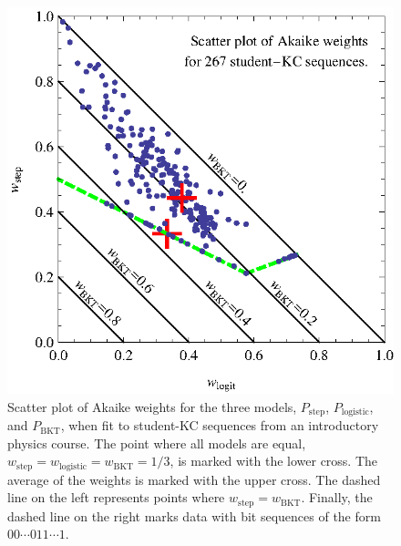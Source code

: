 \documentclass{edm_template}
\begin{document}
\begin{figure}
  \centering \includegraphics{scatter-weights.eps}
  \caption{Scatter plot of  Akaike weights for the three models, 
   $P_\mathrm{step}$, $P_\mathrm{logistic}$, and $P_\mathrm{BKT}$, 
   when fit to student-KC sequences from an introductory physics course.
   The point where all models are equal,
   $w_\mathrm{step}=w_\mathrm{logistic}=w_\mathrm{BKT}=1/3$, is
   marked with the lower cross.  
   The average of the  weights is marked with
   the upper cross.
  The dashed line on the left represents points
   where $w_\mathrm{step}=w_\mathrm{BKT}$.  Finally, the dashed line on 
   the right marks data with bit sequences of the form
   $00\cdots 011\cdots 1$.} 
   \label{scatter1}
\end{figure}
\end{document}
